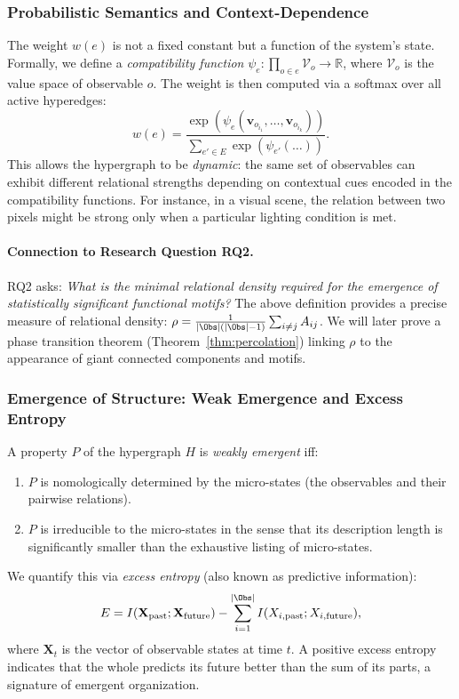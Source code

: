 \subsubsection{Probabilistic Semantics and Context-Dependence}
The weight $w(e)$ is not a fixed constant but a function of the system's state. Formally, we define a \emph{compatibility function} $\psi_e: \prod_{o \in e} \mathcal{V}_o \to \mathbb{R}$, where $\mathcal{V}_o$ is the value space of observable $o$. The weight is then computed via a softmax over all active hyperedges:
\[
w(e) = \frac{\exp(\psi_e(\mathbf{v}_{o_{i_1}}, \dots, \mathbf{v}_{o_{i_k}}))}{\sum_{e' \in E} \exp(\psi_{e'}(\dots))}.
\]
This allows the hypergraph to be \emph{dynamic}: the same set of observables can exhibit different relational strengths depending on contextual cues encoded in the compatibility functions. For instance, in a visual scene, the relation between two pixels might be strong only when a particular lighting condition is met.

\paragraph{Connection to Research Question RQ2.}
RQ2 asks: \emph{What is the minimal relational density required for the emergence of statistically significant functional motifs?} The above definition provides a precise measure of relational density: $\rho = \frac{1}{|\Obs|(|\Obs|-1)} \sum_{i \neq j} A_{ij}$. We will later prove a phase transition theorem (Theorem~\ref{thm:percolation}) linking $\rho$ to the appearance of giant connected components and motifs.

\subsubsection{Emergence of Structure: Weak Emergence and Excess Entropy}
\begin{definition}
A property $P$ of the hypergraph $H$ is \emph{weakly emergent} iff:
\begin{enumerate}
    \item $P$ is nomologically determined by the micro-states (the observables and their pairwise relations).
    \item $P$ is irreducible to the micro-states in the sense that its description length is significantly smaller than the exhaustive listing of micro-states.
\end{enumerate}
\end{definition}
We quantify this via \emph{excess entropy} (also known as predictive information):
\[
E = I(\mathbf{X}_{\text{past}}; \mathbf{X}_{\text{future}}) - \sum_{i=1}^{|\Obs|} I(X_{i,\text{past}}; X_{i,\text{future}}),
\]
where $\mathbf{X}_t$ is the vector of observable states at time $t$. A positive excess entropy indicates that the whole predicts its future better than the sum of its parts, a signature of emergent organization.

